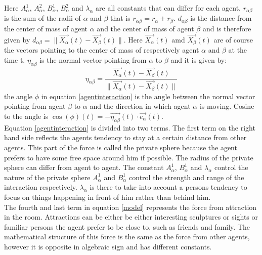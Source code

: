 Here $A_{\alpha}^{1}$, $A_{\alpha}^{2}$, $B_{\alpha}^{1}$, $B_{\alpha}^{2}$ and $\lambda_{\alpha}$ are all constants that can differ for each agent. $r_{\alpha \beta}$ is the sum of the radii of $\alpha$ and $\beta$ that is 
$r_{\alpha \beta} = r_{\alpha} + r_{\beta}$. $d_{\alpha \beta}$ is the distance from the center of mass of agent $\alpha$ and the center of mass of agent $\beta$ and is therefore given by $d_{\alpha \beta} = \|\vec{X_{\alpha}}\left( t \right) - \vec{X_{\beta}}\left( t \right) \|$. Here $\vec{X_{\alpha}}\left( t \right)$ amd $\vec{X_{\beta}}\left( t \right)$ are of course the vectors pointing to the center of mass of respectively agent $\alpha$ and $\beta$ at the time t. $\eta_{\alpha \beta}$ is the normal vector pointing from $\alpha$ to $\beta$ and it is given by:
\begin{equation}
\eta_{\alpha \beta} = \frac{\vec{X_{\alpha}}\left( t \right) - \vec{X_{\beta}}\left( t \right)}{\|\vec{X_{\alpha}}\left( t \right) - \vec{X_{\beta}}\left( t \right) \|}
\end{equation}
the angle $\phi$ in equation \ref{agentinteraction} is the angle between the normal vector pointing from agent $\beta$ to $\alpha$ and the direction in which agent $\alpha$ is moving. Cosine to the angle is $\cos \left( \phi \right)\left( t \right) = - \vec{\eta_{\alpha \beta}}\left( t \right) \cdot \vec{e_{\alpha}}\left( t \right)$.\\
Equation \ref{agentinteraction} is divided into two terms. The first term on the right hand side reflects the agents tendency to stay at a certain distance from other agents. This part of the force is called the private sphere because the agent prefers to have some free space around him if possible. The radius of the private sphere can differ from agent to agent. The constant $A_{\alpha}^{1}$, $B_{\alpha}^{1}$ and $\lambda_{\alpha}$ control the nature of the private sphere $A_{\alpha}^1$ and $B_{\alpha}^1$ control the strength and range of the interaction respectively. $\lambda_{\alpha}$ is there to take into account a persons tendency to focus on things happening in front of him rather than behind him.\\
The fourth and last term in equation \ref{model} represents the force from attraction in the room. Attractions can be either be either interesting sculptures or sights or familiar persons the agent prefer to be close to, such as friends and family. The mathematical structure of this force is the same as the force from other agents, however it is opposite in algebraic sign and has different constants. 
